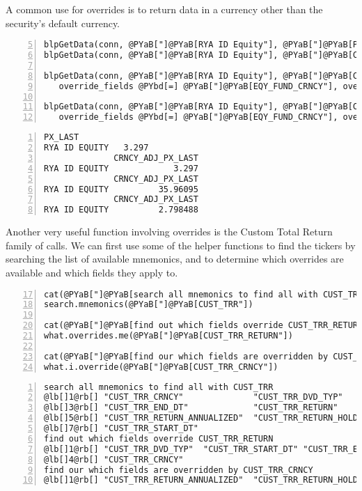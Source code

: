 \documentclass[a4paper]{article}
\begin{document}
A common use for overrides is to return data in a currency other than the security's default currency.

\begin{Verbatim}[commandchars=@\[\],numbers=left,firstnumber=5,stepnumber=1]
blpGetData(conn, @PYaB["]@PYaB[RYA ID Equity"], @PYaB["]@PYaB[PX_LAST"])
blpGetData(conn, @PYaB["]@PYaB[RYA ID Equity"], @PYaB["]@PYaB[CRNCY_ADJ_PX_LAST"])

blpGetData(conn, @PYaB["]@PYaB[RYA ID Equity"], @PYaB["]@PYaB[CRNCY_ADJ_PX_LAST"], 
   override_fields @PYbd[=] @PYaB["]@PYaB[EQY_FUND_CRNCY"], overrides @PYbd[=] @PYaB["]@PYaB[HKD"])

blpGetData(conn, @PYaB["]@PYaB[RYA ID Equity"], @PYaB["]@PYaB[CRNCY_ADJ_PX_LAST"], 
   override_fields @PYbd[=] @PYaB["]@PYaB[EQY_FUND_CRNCY"], overrides @PYbd[=] @PYaB["]@PYaB[GBP"])
\end{Verbatim}

    

\begin{Verbatim}[commandchars=@\[\],numbers=left,firstnumber=1,stepnumber=1]
              PX_LAST
RYA ID EQUITY   3.297
              CRNCY_ADJ_PX_LAST
RYA ID EQUITY             3.297
              CRNCY_ADJ_PX_LAST
RYA ID EQUITY          35.96095
              CRNCY_ADJ_PX_LAST
RYA ID EQUITY          2.798488
\end{Verbatim}

    

Another very useful function involving overrides is the Custom Total Return family of calls. We can first use some of the helper functions to find the tickers by searching the list of available mnemonics, and to determine which overrides are available and which fields they apply to.

\begin{Verbatim}[commandchars=@\[\],numbers=left,firstnumber=17,stepnumber=1]
cat(@PYaB["]@PYaB[search all mnemonics to find all with CUST_TRR\n"])
search.mnemonics(@PYaB["]@PYaB[CUST_TRR"])

cat(@PYaB["]@PYaB[find out which fields override CUST_TRR_RETURN\n"])
what.overrides.me(@PYaB["]@PYaB[CUST_TRR_RETURN"])

cat(@PYaB["]@PYaB[find our which fields are overridden by CUST_TRR_CRNCY\n"])
what.i.override(@PYaB["]@PYaB[CUST_TRR_CRNCY"])
\end{Verbatim}

    

\begin{Verbatim}[commandchars=@\[\],numbers=left,firstnumber=1,stepnumber=1]
search all mnemonics to find all with CUST_TRR
@lb[]1@rb[] "CUST_TRR_CRNCY"              "CUST_TRR_DVD_TYP"           
@lb[]3@rb[] "CUST_TRR_END_DT"             "CUST_TRR_RETURN"            
@lb[]5@rb[] "CUST_TRR_RETURN_ANNUALIZED"  "CUST_TRR_RETURN_HOLDING_PER"
@lb[]7@rb[] "CUST_TRR_START_DT"          
find out which fields override CUST_TRR_RETURN
@lb[]1@rb[] "CUST_TRR_DVD_TYP"  "CUST_TRR_START_DT" "CUST_TRR_END_DT"  
@lb[]4@rb[] "CUST_TRR_CRNCY"   
find our which fields are overridden by CUST_TRR_CRNCY
@lb[]1@rb[] "CUST_TRR_RETURN_ANNUALIZED"  "CUST_TRR_RETURN_HOLDING_PER"
\end{Verbatim}
\end{document}
